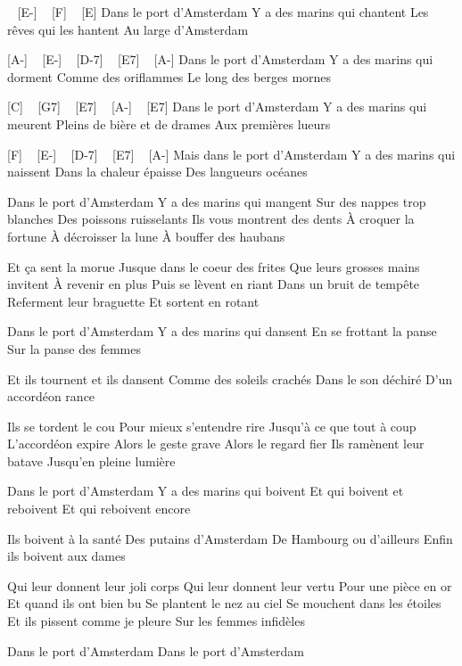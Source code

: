 \begin{guitar}
[A-] ~ [E-] ~ [F] ~ [E]
Dans le port d'Amsterdam
Y a des marins qui chantent
Les rêves qui les hantent
Au large d'Amsterdam

[A-] ~ [E-]  ~ [D-7] ~ [E7] ~ [A-]
Dans le port d'Amsterdam
Y a des marins qui dorment
Comme des oriflammes
Le long des berges mornes

[C] ~ [G7] ~ [E7] ~ [A-] ~ [E7]
Dans le port d'Amsterdam
Y a des marins qui meurent
Pleins de bière et de drames
Aux premières lueurs

[F] ~ [E-] ~ [D-7] ~ [E7] ~ [A-]
Mais dans le port d'Amsterdam
Y a des marins qui naissent
Dans la chaleur épaisse
Des langueurs océanes

Dans le port d'Amsterdam
Y a des marins qui mangent
Sur des nappes trop blanches
Des poissons ruisselants
Ils vous montrent des dents
À croquer la fortune
À décroisser la lune
À bouffer des haubans

Et ça sent la morue
Jusque dans le coeur des frites
Que leurs grosses mains invitent
À revenir en plus
Puis se lèvent en riant
Dans un bruit de tempête
Referment leur braguette
Et sortent en rotant

Dans le port d'Amsterdam
Y a des marins qui dansent
En se frottant la panse
Sur la panse des femmes

Et ils tournent et ils dansent
Comme des soleils crachés
Dans le son déchiré
D'un accordéon rance

Ils se tordent le cou
Pour mieux s'entendre rire
Jusqu'à ce que tout à coup
L'accordéon expire
Alors le geste grave
Alors le regard fier
Ils ramènent leur batave
Jusqu'en pleine lumière

Dans le port d'Amsterdam
Y a des marins qui boivent
Et qui boivent et reboivent
Et qui reboivent encore

Ils boivent à la santé
Des putains d'Amsterdam
De Hambourg ou d'ailleurs
Enfin ils boivent aux dames

Qui leur donnent leur joli corps
Qui leur donnent leur vertu
Pour une pièce en or
Et quand ils ont bien bu
Se plantent le nez au ciel
Se mouchent dans les étoiles
Et ils pissent comme je pleure
Sur les femmes infidèles

Dans le port d'Amsterdam
Dans le port d'Amsterdam
\end{guitar}
